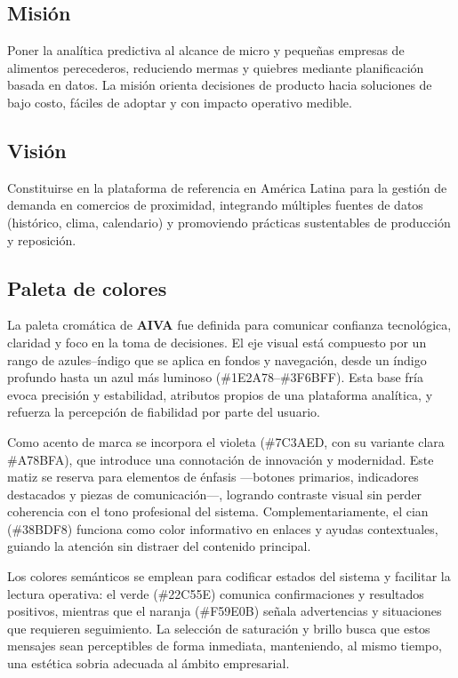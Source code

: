 \subsection{Misión}
Poner la analítica predictiva al alcance de micro y pequeñas empresas de alimentos perecederos, reduciendo mermas y quiebres mediante planificación basada en datos. La misión orienta decisiones de producto hacia soluciones de bajo costo, fáciles de adoptar y con impacto operativo medible.

\subsection{Visión}
Constituirse en la plataforma de referencia en América Latina para la gestión de demanda en comercios de proximidad, integrando múltiples fuentes de datos (histórico, clima, calendario) y promoviendo prácticas sustentables de producción y reposición.

\subsection{Paleta de colores}\label{subsec:paleta}

La paleta cromática de \textbf{AIVA} fue definida para comunicar confianza tecnológica, claridad y foco en la toma de decisiones. El eje visual está compuesto por un rango de azules–índigo que se aplica en fondos y navegación, desde un índigo profundo hasta un azul más luminoso (\#1E2A78–\#3F6BFF). Esta base fría evoca precisión y estabilidad, atributos propios de una plataforma analítica, y refuerza la percepción de fiabilidad por parte del usuario.

Como acento de marca se incorpora el violeta (\#7C3AED, con su variante clara \#A78BFA), que introduce una connotación de innovación y modernidad. Este matiz se reserva para elementos de énfasis —botones primarios, indicadores destacados y piezas de comunicación—, logrando contraste visual sin perder coherencia con el tono profesional del sistema. Complementariamente, el cian (\#38BDF8) funciona como color informativo en enlaces y ayudas contextuales, guiando la atención sin distraer del contenido principal.

Los colores semánticos se emplean para codificar estados del sistema y facilitar la lectura operativa: el verde (\#22C55E) comunica confirmaciones y resultados positivos, mientras que el naranja (\#F59E0B) señala advertencias y situaciones que requieren seguimiento. La selección de saturación y brillo busca que estos mensajes sean perceptibles de forma inmediata, manteniendo, al mismo tiempo, una estética sobria adecuada al ámbito empresarial.

